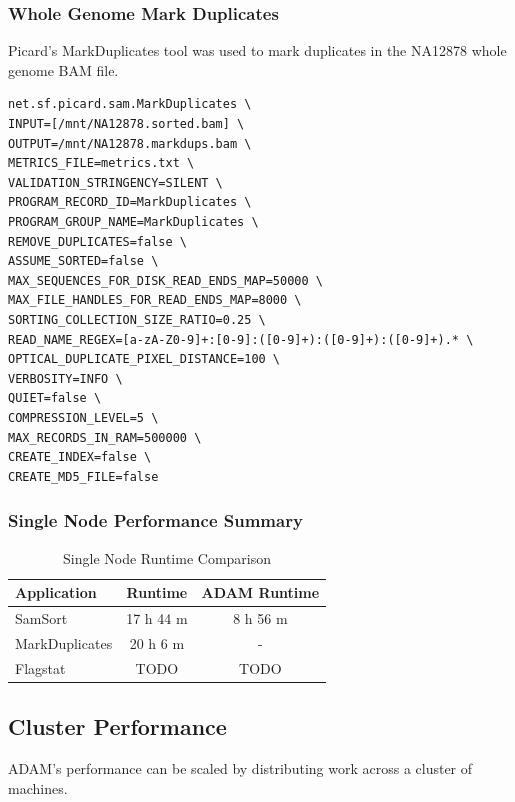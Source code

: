 \documentclass[10pt,twocolumn]{article}
\theoremstyle{plain}
\begin{document}
\subsubsection{Whole Genome Mark Duplicates}
\label{sec:single-node-whole-genome}

Picard's MarkDuplicates tool was used to mark duplicates in the NA12878 whole genome BAM file.

\begin{lstlisting}
net.sf.picard.sam.MarkDuplicates \
INPUT=[/mnt/NA12878.sorted.bam] \
OUTPUT=/mnt/NA12878.markdups.bam \
METRICS_FILE=metrics.txt \
VALIDATION_STRINGENCY=SILENT \
PROGRAM_RECORD_ID=MarkDuplicates \
PROGRAM_GROUP_NAME=MarkDuplicates \
REMOVE_DUPLICATES=false \
ASSUME_SORTED=false \
MAX_SEQUENCES_FOR_DISK_READ_ENDS_MAP=50000 \
MAX_FILE_HANDLES_FOR_READ_ENDS_MAP=8000 \
SORTING_COLLECTION_SIZE_RATIO=0.25 \
READ_NAME_REGEX=[a-zA-Z0-9]+:[0-9]:([0-9]+):([0-9]+):([0-9]+).* \
OPTICAL_DUPLICATE_PIXEL_DISTANCE=100 \
VERBOSITY=INFO \
QUIET=false \
COMPRESSION_LEVEL=5 \
MAX_RECORDS_IN_RAM=500000 \
CREATE_INDEX=false \
CREATE_MD5_FILE=false
\end{lstlisting}

\subsubsection{Single Node Performance Summary}
\label{sec:single-node-summary}

\begin{table}[h]
\caption{Single Node Runtime Comparison}
\label{tab:single-node-performance}
\begin{center}
\begin{tabular}{| l | c | c |}
\hline
\bf Application & \bf Runtime & \bf ADAM Runtime \\
\hline
SamSort & 17 h 44 m & 8 h 56 m \\
MarkDuplicates & 20 h 6 m & - \\  
Flagstat & TODO & TODO \\
\hline
\end{tabular}
\end{center}
\end{table}

\subsection{Cluster Performance}

ADAM's performance can be scaled by distributing work across a cluster of machines.
\end{document}
